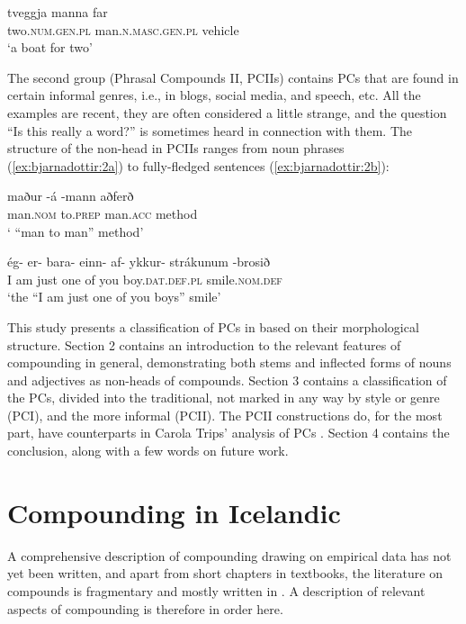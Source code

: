 \documentclass[output=paper]{LSP/langsci}
\begin{document}
\ex\label{ex:bjarnadottir:1b}
\gll tveggja manna far\\
 two.\textsc{num.gen.pl} man.\textsc{n.masc.gen.pl} vehicle\\

\glt ‘a boat for two’  
\z
\z

The second group (Phrasal Compounds II, PCIIs) contains PCs that are found in certain informal genres, i.e., in blogs, social media, and speech, etc. All the examples are recent, they are often considered a little strange, and the question “Is this really a word?” is sometimes heard in connection with them. The structure of the non-head in PCIIs ranges from  noun phrases (\ref{ex:bjarnadottir:2a}) to fully-fledged sentences (\ref{ex:bjarnadottir:2b}):

\ea%
 \label{ex:bjarnadottir:2} 
\ea \label{ex:bjarnadottir:2a} 
\gll maður -á -mann aðferð\\
 man.\textsc{nom} to.\textsc{prep} man.\textsc{acc} method\\
\glt ‘ “man to man” method’

\ex \label{ex:bjarnadottir:2b} 
\gll ég- er- bara- einn- af- ykkur- strákunum -brosið\\
 I am just one of you boy.\textsc{dat.def.pl} smile.\textsc{nom.def}\\
\glt ‘the “I am just one of you boys” smile’
\z
\z

This study presents a classification of PCs in  based on their morphological structure. Section 2 contains an introduction to the relevant features of  compounding in general, demonstrating both stems and inflected forms of nouns and adjectives as non-heads of compounds. Section 3 contains a classification of the PCs, divided into the traditional, not marked in any way by style or genre (PCI), and the more informal (PCII). The PCII constructions do, for the most part, have counterparts in Carola Trips’ analysis of  PCs \citep{Trips2016}. Section 4 contains the conclusion, along with a few words on future work. 

\section{Compounding in Icelandic}\label{sec:bjarnadottir:2}

A comprehensive description of  compounding drawing on empirical data has not yet been written, and apart from short chapters in textbooks, the  literature on  compounds is fragmentary and mostly written in . A description of relevant aspects of  compounding is therefore in order here.
\end{document}
